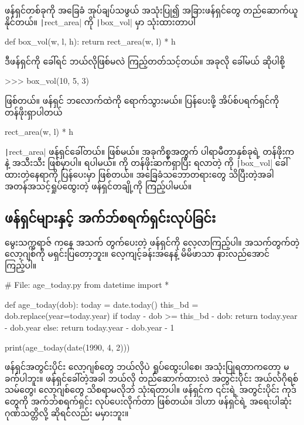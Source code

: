 ဖန်ရှင်တစ်ခုကို အခြေခံ အုပ်ချပ်သဖွယ် အသုံးပြု၍ အခြားဖန်ရှင်တွေ တည်ဆောက်ယူနိုင်တယ်။ \texttt|rect_area| ကို \texttt|box_vol| မှာ သုံးထားတာပါ
\begin{codetxt}
def box_vol(w, l, h):
    return rect_area(w, l) * h
\end{codetxt}
ဒီဖန်ရှင်ကို ခေါ်ရင် ဘယ်လိုဖြစ်မလဲ ကြည့်တတ်သင့်တယ်။ အခုလို ခေါ်မယ် ဆိုပါစို့
\begin{codetxt}
>>> box_vol(10, 5, 3)
\end{codetxt}
\fEn{,} \fEn{,}  ဖြစ်တယ်။ ဖန်ရှင် ဘလောက်ထဲကို ရောက်သွားမယ်။  ပြန်ပေးဖို့ အိပ်စ်ပရက်ရှင်ကို တန်ဖိုးရှာပါတယ်
\begin{codetxt}
rect_area(w, l) * h
\end{codetxt}
\texttt|rect_area| ဖန်ရှင်ခေါ်တယ်။ \fEn{,}  ဖြစ်မယ်။ အခုကိစ္စအတွက် ပါရာမီတာနှစ်ခုရဲ့ တန်ဖိုးက  နဲ့  အသီးသီး ဖြစ်မှာပါ။    ရပါမယ်။  ကို တန်ဖိုးဆက်ရှာပြီး ရလာတဲ့  ကို \texttt|box_vol| ခေါ်ထားတဲ့နေရာကို  ပြန်ပေးမှာ ဖြစ်တယ်။ အခြေခံသဘောတရားတွေ သိပြီးတဲ့အခါ အတန်အသင့်ရှုပ်ထွေးတဲ့ ဖန်ရှင်တချို့ကို ကြည့်ပါမယ်။

\subsection*{ဖန်ရှင်များနှင့် အက်ဘ်စရက်ရှင်းလုပ်ခြင်း}
မွေးသက္ကရာဇ်   ကနေ အသက် တွက်ပေးတဲ့ ဖန်ရှင်ကို လေ့လာကြည့်ပါ။ အသက်တွက်တဲ့ လော့ဂျစ်ကို မရှင်းပြတော့ဘူး။ လေ့ကျင့်ခန်းအနေနဲ့ မိမိဖာသာ နားလည်အောင်ကြည့်ပါ။
%
\begin{py}
# File: age_today.py
from datetime import *

def age_today(dob):
    today = date.today()
    this_bd = dob.replace(year=today.year)
    if today - dob >= this_bd - dob:
        return today.year - dob.year
    else:
        return today.year - dob.year - 1

print(age_today(date(1990, 4, 2)))
\end{py}
%
ဖန်ရှင်အတွင်းပိုင်း လော့ဂျစ်တွေ ဘယ်လိုပဲ ရှုပ်ထွေးပါစေ၊ အသုံးပြုရတာကတော့ မခက်ပါဘူး။ ဖန်ရှင်ခေါ်တဲ့အခါ ဘယ်လို တည်ဆောက်ထားလဲ အတွင်းပိုင်း အယ်လ်ဂိုရစ်သမ်တွေ၊ လော့ဂျစ်တွေ သိစရာမလိုဘဲ သုံးရတာပါ။ ဖန်ရှင်က ၎င်းရဲ့ အတွင်းပိုင်း ကုဒ်တွေကို အက်ဘ်စရက်ရှင်း  လုပ်ပေးလိုက်တာ ဖြစ်တယ်။ ဒါဟာ ဖန်ရှင်ရဲ့ အရေးပါဆုံး ဂုဏ်သတ္တိလို့ ဆိုရင်လည်း မမှားဘူး။


